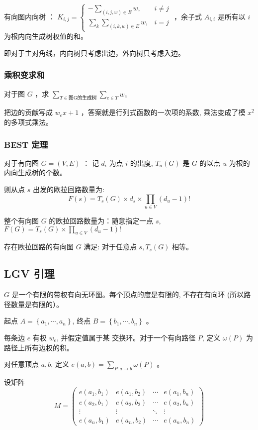 有向图内向树 ： $K_{i, j}= \begin{cases}-\sum_{(i, j, w) \in E} w, & i \neq j \\ \sum_k \sum_{(i, k, w) \in E} w, & i=j\end{cases}$ ，余子式 $A_{i,i}$ 是所有以 $i$ 为根内向生成树权值的和。


即对于主对角线，内向树只考虑出边，外向树只考虑入边。

\subsubsection*{乘积变求和}

对于图 $G$ ，求 $\sum_{T \in \text{图G的生成树}} \sum_{e \in T} w_e$

把边的贡献写成 $w_e x+1$ ，答案就是行列式函数的一次项的系数, 乘法变成了模 $x^2$ 的多项式乘法。

\subsubsection*{BEST 定理}

对于有向图 $G=(V, E)$ ： 记 $d_i$ 为点 $i$ 的出度, $T_u(G)$ 是 $G$ 的以点 $u$ 为根的内向生成树的个数。

则从点 $s$ 出发的欧拉回路数量为:
$$
F(s)=T_s(G) \times d_{s} \times \prod_{u \in V}\left(d_u-1\right) !
$$

整个有向图 $G$ 的欧拉回路数量为：随意指定一点 $s$, $F(G)=T_s(G) \times \prod_{u \in V}\left(d_u-1\right) !$

存在欧拉回路的有向图 $G$ 满足: 对于任意点 $s, T_s(G)$ 相等。

\newpage

\subsection{LGV 引理}

$G$ 是一个有限的带权有向无环图。每个顶点的度是有限的, 不存在有向环 (所以路径数量是有限的）。

起点 $A=\left\{a_1, \cdots, a_n\right\}$, 终点 $B=\left\{b_1, \cdots, b_n\right\}$ 。

每条边 $e$ 有权 $w_e$, 并假定值属于某 交换环。对于一个有向路径 $P$, 定义 $\omega(P)$ 为路径上所有边权的积。

对任意顶点 $a, b$, 定义 $e(a, b)=\sum_{P: a \rightarrow b} \omega(P)$ 。

设矩阵
$$
M=\left(\begin{array}{cccc}
e\left(a_1, b_1\right) & e\left(a_1, b_2\right) & \cdots & e\left(a_1, b_n\right) \\
e\left(a_2, b_1\right) & e\left(a_2, b_2\right) & \cdots & e\left(a_2, b_n\right) \\
\vdots & \vdots & \ddots & \vdots \\
e\left(a_n, b_1\right) & e\left(a_n, b_2\right) & \cdots & e\left(a_n, b_n\right)
\end{array}\right)
$$

